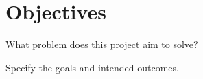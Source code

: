 \section{Objectives} 
What problem does this project aim to solve?

Specify the goals and intended outcomes.
